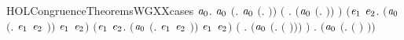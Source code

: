 \begin{SaveVerbatim}{HOLCongruenceTheoremsWGXXcases}
\HOLTokenTurnstile{} \HOLSymConst{\HOLTokenForall{}}\ensuremath{\HOLBoundVar{a}\sb{\mathrm{0}}}.
        \ensuremath{\HOLBoundVar{a}\sb{\mathrm{0}}} \HOLSymConst{\HOLTokenEquiv{}}
       \ensuremath{(}\HOLSymConst{\HOLTokenExists{}}. \ensuremath{\HOLBoundVar{a}\sb{\mathrm{0}}} \HOLSymConst{\ensuremath{=}} \ensuremath{(}\HOLTokenLambda{}. \ensuremath{)}\ensuremath{)} \HOLSymConst{\HOLTokenDisj{}}
       \ensuremath{(}\HOLSymConst{\HOLTokenExists{}} . \ensuremath{(}\ensuremath{\HOLBoundVar{a}\sb{\mathrm{0}}} \HOLSymConst{\ensuremath{=}} \ensuremath{(}\HOLTokenLambda{}. \HOLSymConst{\ensuremath{\ldotp}} \ensuremath{)}\ensuremath{)} \HOLSymConst{\HOLTokenConj{}}  \ensuremath{)} \HOLSymConst{\HOLTokenDisj{}}
       \ensuremath{(}\HOLSymConst{\HOLTokenExists{}}\ensuremath{\HOLBoundVar{e}\sb{\mathrm{1}}} \ensuremath{\HOLBoundVar{e}\sb{\mathrm{2}}}. \ensuremath{(}\ensuremath{\HOLBoundVar{a}\sb{\mathrm{0}}} \HOLSymConst{\ensuremath{=}} \ensuremath{(}\HOLTokenLambda{}. \ensuremath{\HOLBoundVar{e}\sb{\mathrm{1}}}  \HOLSymConst{\ensuremath{+}} \ensuremath{\HOLBoundVar{e}\sb{\mathrm{2}}} \ensuremath{)}\ensuremath{)} \HOLSymConst{\HOLTokenConj{}}  \ensuremath{\HOLBoundVar{e}\sb{\mathrm{1}}} \HOLSymConst{\HOLTokenConj{}}  \ensuremath{\HOLBoundVar{e}\sb{\mathrm{2}}}\ensuremath{)} \HOLSymConst{\HOLTokenDisj{}}
       \ensuremath{(}\HOLSymConst{\HOLTokenExists{}}\ensuremath{\HOLBoundVar{e}\sb{\mathrm{1}}} \ensuremath{\HOLBoundVar{e}\sb{\mathrm{2}}}. \ensuremath{(}\ensuremath{\HOLBoundVar{a}\sb{\mathrm{0}}} \HOLSymConst{\ensuremath{=}} \ensuremath{(}\HOLTokenLambda{}. \ensuremath{\HOLBoundVar{e}\sb{\mathrm{1}}}  \HOLSymConst{\ensuremath{\mid}} \ensuremath{\HOLBoundVar{e}\sb{\mathrm{2}}} \ensuremath{)}\ensuremath{)} \HOLSymConst{\HOLTokenConj{}}  \ensuremath{\HOLBoundVar{e}\sb{\mathrm{1}}} \HOLSymConst{\HOLTokenConj{}}  \ensuremath{\HOLBoundVar{e}\sb{\mathrm{2}}}\ensuremath{)} \HOLSymConst{\HOLTokenDisj{}}
       \ensuremath{(}\HOLSymConst{\HOLTokenExists{}} . \ensuremath{(}\ensuremath{\HOLBoundVar{a}\sb{\mathrm{0}}} \HOLSymConst{\ensuremath{=}} \ensuremath{(}\HOLTokenLambda{}.   \ensuremath{(} \ensuremath{)}\ensuremath{)}\ensuremath{)} \HOLSymConst{\HOLTokenConj{}}  \ensuremath{)} \HOLSymConst{\HOLTokenDisj{}}
       \HOLSymConst{\HOLTokenExists{}} . \ensuremath{(}\ensuremath{\HOLBoundVar{a}\sb{\mathrm{0}}} \HOLSymConst{\ensuremath{=}} \ensuremath{(}\HOLTokenLambda{}.  \ensuremath{(} \ensuremath{)} \ensuremath{)}\ensuremath{)} \HOLSymConst{\HOLTokenConj{}}  
\end{SaveVerbatim}
